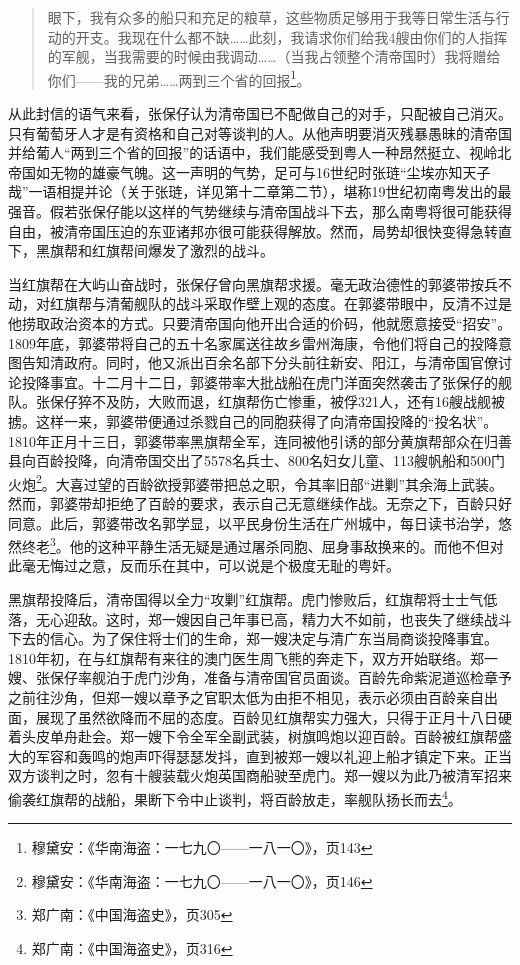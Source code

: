 \begin{quote}

眼下，我有众多的船只和充足的粮草，这些物质足够用于我等日常生活与行动的开支。我现在什么都不缺……此刻，我请求你们给我4艘由你们的人指挥的军舰，当我需要的时候由我调动……（当我占领整个清帝国时）我将赠给你们——我的兄弟……两到三个省的回报\footnote{穆黛安：《华南海盗：一七九〇——一八一〇》，页143}。

\end{quote}

从此封信的语气来看，张保仔认为清帝国已不配做自己的对手，只配被自己消灭。只有葡萄牙人才是有资格和自己对等谈判的人。从他声明要消灭残暴愚昧的清帝国并给葡人“两到三个省的回报”的话语中，我们能感受到粤人一种昂然挺立、视岭北帝国如无物的雄豪气魄。这一声明的气势，足可与16世纪时张琏“尘埃亦知天子哉”一语相提并论（关于张琏，详见第十二章第二节），堪称19世纪初南粤发出的最强音。假若张保仔能以这样的气势继续与清帝国战斗下去，那么南粤将很可能获得自由，被清帝国压迫的东亚诸邦亦很可能获得解放。然而，局势却很快变得急转直下，黑旗帮和红旗帮间爆发了激烈的战斗。

当红旗帮在大屿山奋战时，张保仔曾向黑旗帮求援。毫无政治德性的郭婆带按兵不动，对红旗帮与清葡舰队的战斗采取作壁上观的态度。在郭婆带眼中，反清不过是他捞取政治资本的方式。只要清帝国向他开出合适的价码，他就愿意接受“招安”。1809年底，郭婆带将自己的五十名家属送往故乡雷州海康，令他们将自己的投降意图告知清政府。同时，他又派出百余名部下分头前往新安、阳江，与清帝国官僚讨论投降事宜。十二月十二日，郭婆带率大批战船在虎门洋面突然袭击了张保仔的舰队。张保仔猝不及防，大败而退，红旗帮伤亡惨重，被俘321人，还有16艘战舰被掳。这样一来，郭婆带便通过杀戮自己的同胞获得了向清帝国投降的“投名状”。1810年正月十三日，郭婆带率黑旗帮全军，连同被他引诱的部分黄旗帮部众在归善县向百龄投降，向清帝国交出了5578名兵士、800名妇女儿童、113艘帆船和500门火炮\footnote{穆黛安：《华南海盗：一七九〇——一八一〇》，页146}。大喜过望的百龄欲授郭婆带把总之职，令其率旧部“进剿”其余海上武装。然而，郭婆带却拒绝了百龄的要求，表示自己无意继续作战。无奈之下，百龄只好同意。此后，郭婆带改名郭学显，以平民身份生活在广州城中，每日读书治学，悠然终老\footnote{郑广南：《中国海盗史》，页305}。他的这种平静生活无疑是通过屠杀同胞、屈身事敌换来的。而他不但对此毫无悔过之意，反而乐在其中，可以说是个极度无耻的粤奸。

黑旗帮投降后，清帝国得以全力“攻剿”红旗帮。虎门惨败后，红旗帮将士士气低落，无心迎敌。这时，郑一嫂因自己年事已高，精力大不如前，也丧失了继续战斗下去的信心。为了保住将士们的生命，郑一嫂决定与清广东当局商谈投降事宜。1810年初，在与红旗帮有来往的澳门医生周飞熊的奔走下，双方开始联络。郑一嫂、张保仔率舰泊于虎门沙角，准备与清帝国官员面谈。百龄先命紫泥道巡检章予之前往沙角，但郑一嫂以章予之官职太低为由拒不相见，表示必须由百龄亲自出面，展现了虽然欲降而不屈的态度。百龄见红旗帮实力强大，只得于正月十八日硬着头皮单舟赴会。郑一嫂下令全军全副武装，树旗鸣炮以迎百龄。百龄被红旗帮盛大的军容和轰鸣的炮声吓得瑟瑟发抖，直到被郑一嫂以礼迎上船才镇定下来。正当双方谈判之时，忽有十艘装载火炮英国商船驶至虎门。郑一嫂以为此乃被清军招来偷袭红旗帮的战船，果断下令中止谈判，将百龄放走，率舰队扬长而去\footnote{郑广南：《中国海盗史》，页316}。

